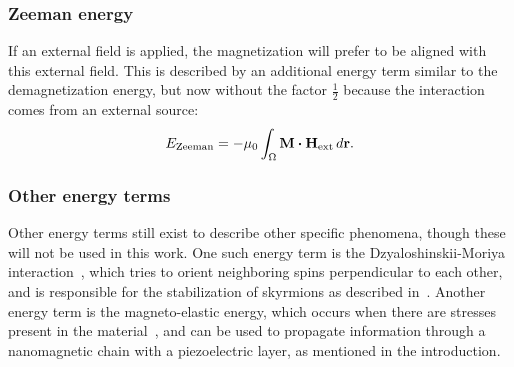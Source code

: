 \documentclass[11pt,a4paper,english,twoside]{article}
\begin{document}
\subsubsection{Zeeman energy}
If an external field is applied, the magnetization will prefer to be aligned with this external field. This is described by an additional energy term similar to the demagnetization energy, but now without the factor $\frac{1}{2}$ because the interaction comes from an external source:
\begin{equation}
    E_\mathrm{Zeeman} = -\mu_0 \int_\Omega \vb{M} \vdot \vb{H_\mathrm{ext}} \, d\vb{r} \mathrm{.} \label{eq:Energy_Term_Zeeman}
\end{equation}

\subsubsection{Other energy terms}
Other energy terms still exist to describe other specific phenomena, though these will not be used in this work. One such energy term is the Dzyaloshinskii-Moriya interaction~\cite{DzyaloshinskiiMoriya}, which tries to orient neighboring spins perpendicular to each other, and is responsible for the stabilization of skyrmions as described in~\cite{skyrmions}. Another energy term is the magneto-elastic energy, which occurs when there are stresses present in the material~\cite{Gilbert1956}, and can be used to propagate information through a nanomagnetic chain with a piezoelectric layer, as mentioned in the introduction.
\end{document}
